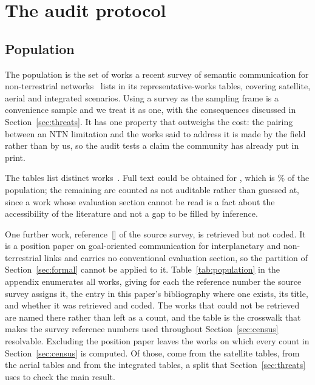 \documentclass[preprint,11pt,3p]{elsarticle}
\begin{document}
\section{The audit protocol}
\label{sec:protocol}

\subsection{Population}

The population is the set of works a recent survey of semantic communication for non-terrestrial
networks~\cite{survey2026ntnsemcom} lists in its representative-works tables, covering satellite,
aerial and integrated scenarios. Using a survey as the sampling frame is a convenience sample and we treat it as one,
with the consequences discussed in Section~\ref{sec:threats}. It has one property that outweighs
the cost: the pairing between an NTN limitation and the works said to address it is made by the
field rather than by us, so the audit tests a claim the community has already put in print.

The tables list \numPop{} distinct works~\cite{bhattacharjee2024r113,cao2025r94,chou2024r154,hassan2024r95,huang2024r112,huang2026r117,huang2026r165,jiang2024r93,joshi2026r179,kang2022r180,lin2023r116,liu2026r100,nguyen2024r115,nguyen2025r104,nguyenkha2026r170,qiu2025r200,razlighi2026r118,sankara2026r186,siyun2025r191,song2024r102,tian2026r178,uysal2024r108,yin2025r203,zeng2026r81,zhang2024r161,zhao2024r114,zheng2026r190}. Full text could be obtained for \numFull{}, which is
\numFullPct\% of the population; the remaining \numNotFull{} are counted as not auditable rather
than guessed at, since a work whose evaluation section cannot be read is a fact about the
accessibility of the literature and not a gap to be filled by inference.

One further work, reference~[\numDropRef] of the source survey, is retrieved but not coded. It is
a position paper on goal-oriented communication for interplanetary and non-terrestrial links and
carries no conventional evaluation section, so the partition of Section~\ref{sec:formal} cannot
be applied to it. Table~\ref{tab:population} in the appendix enumerates all \numPop{} works, giving for each the
reference number the source survey assigns it, the entry in this paper's bibliography where one
exists, its title, and whether it was retrieved and coded. The \numNotRetrieved{} works that
could not be retrieved are named there rather than left as a count, and the table is the
crosswalk that makes the survey reference numbers used throughout
Section~\ref{sec:census} resolvable. Excluding the position paper leaves the \numCoded{} works on
which every count in Section~\ref{sec:census} is computed. Of those, \numSat{} come from the satellite tables,
\numAerial{} from the aerial tables and \numIntegrated{} from the integrated tables, a split
that Section~\ref{sec:threats} uses to check the main result.
\end{document}
